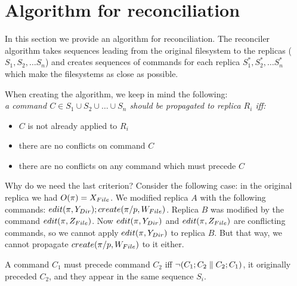 \section{Algorithm for reconciliation}
\label{sec:alg}

In this section we provide an algorithm for reconciliation. The reconciler
algorithm takes sequences leading from the original filesystem to the
replicas (\(S_1, S_2, \ldots S_n\)) and creates sequences of commands for
each replica \(S_1^*, S_2^*, \ldots S_n^*\) which make the
filesystems as close as possible. 

When creating the algorithm, we keep in mind the following:\\
\emph{a command 
\(C\in {S}_1\cup{S}_2\cup\ldots\cup{S}_n\) 
should be propagated to replica \(R_i\) iff:}
\begin{itemize}
\item \(C\) is not already applied to \(R_i\)
\item there are no conflicts on command \(C\)
\item there are no conflicts on any command which must precede \(C\) 
\end{itemize}

\medskip
{\small{
Why do we need the last criterion? Consider the following case: in the
original replica we had \(O(\pi)=X_{File}\). 
We modified replica \(A\) with the following
commands: \(edit(\pi,Y_{Dir}); create(\pi/ p,W_{File})\).
Replica \(B\) was modified by the command \(edit(\pi,Z_{File})\).
Now \(edit(\pi,Y_{Dir})\) and \(edit(\pi,Z_{File})\) are
conflicting commands, so we cannot apply \(edit(\pi,Y_{Dir})\) to replica
\(B\). But that way, we cannot propagate
\(create(\pi/ p,W_{File})\) to it either.
}}\medskip

A
command \(C_1\) must precede command \(C_2\) iff 
\(\neg(C_1; C_2\parallel C_2; C_1)\), it originally preceded \(C_2\),
and they appear in the same sequence \(S_i\). 

